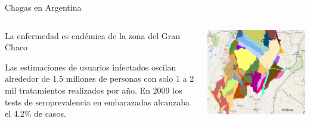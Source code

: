 \documentclass[xcolor=x11names]{beamer}
\begin{document}
\begin{frame}{Chagas en Argentina}
	\begin{columns}
		\begin{column}{0.45\textwidth}
			La enfermedad es endémica de la zona del Gran Chaco

			\medskip Las estimaciones de usuarios infectados oscilan alrededor de 1.5 millones de personas con solo 1 a 2 mil tratamientos realizados por año. En 2009 los tests de seroprevalencia en embarazadas alcanzaba el 4.2\% de casos.

			\medskip

		\end{column}
		\begin{column}{0.45\textwidth}
			\includegraphics[height=.7\textheight]{slides/Ambientes_GranChaco_TNC-Argentina.png}
		\end{column}
	\end{columns}
\end{frame}
\end{document}
